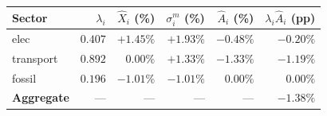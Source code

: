 \begin{tabular}{lrrrrr}
\hline
Sector & $\lambda_i$ & $\hat X_i$ (\%) & $\sigma_i^m$ (\%) & $\hat A_i$ (\%) & $\lambda_i \hat A_i$ (pp) \\
\hline
elec & $0.407$ & $+1.45 \% $ & $+1.93 \% $ & $-0.48 \% $ & $-0.20 \% $ \\
transport & $0.892$ & $0.00 \% $ & $+1.33 \% $ & $-1.33 \% $ & $-1.19 \% $ \\
fossil & $0.196$ & $-1.01 \% $ & $-1.01 \% $ & $0.00 \% $ & $0.00 \% $ \\
\hline
\textbf{Aggregate} & --- & --- & --- & --- & $-1.38 \% $ \\
\hline
\end{tabular}
